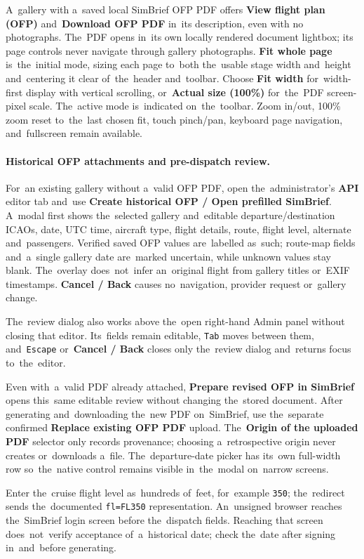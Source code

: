 \documentclass[11pt,a4paper]{article}
\newcommand{\ui}[1]{\textbf{#1}}
\newcommand{\codeword}[1]{\nolinkurl{#1}}
\begin{document}
A~gallery with a~saved local SimBrief OFP PDF offers \ui{View flight plan (OFP)}
and~\ui{Download OFP PDF} in~its description, even with no photographs. The~PDF
opens in~its own locally rendered document lightbox; its page controls never
navigate through gallery photographs. \ui{Fit whole page} is~the~initial mode,
sizing each page to~both the~usable stage width and~height and~centering it
clear of~the~header and~toolbar. Choose \ui{Fit width} for~width-first display
with vertical scrolling, or~\ui{Actual size (100\%)} for~the~PDF screen-pixel
scale. The~active mode is~indicated on~the~toolbar. Zoom in/out, 100\% zoom
reset to~the~last chosen fit, touch pinch/pan, keyboard page navigation,
and~fullscreen remain available.

\paragraph{Historical OFP attachments and pre-dispatch review.}
For~an existing gallery without a~valid OFP PDF, open the~administrator's
\ui{API} editor tab and~use \ui{Create historical OFP / Open prefilled
SimBrief}. A~modal first shows the~selected gallery and~editable
departure/destination ICAOs, date, UTC time, aircraft type, flight details,
route, flight level, alternate and~passengers. Verified saved OFP values
are~labelled as~such; route-map fields and~a~single gallery date are~marked
uncertain, while unknown values stay blank. The~overlay does~not~infer
an~original flight from gallery titles or~EXIF timestamps. \ui{Cancel / Back}
causes no~navigation, provider request or~gallery change.

The~review dialog also works above the~open right-hand Admin panel without
closing that editor. Its~fields remain editable, \codeword{Tab} moves between
them, and~\codeword{Escape} or~\ui{Cancel / Back} closes only the~review dialog
and~returns focus to~the~editor.

Even with~a~valid PDF already attached, \ui{Prepare revised OFP in SimBrief}
opens this~same editable review without changing the~stored document. After
generating and~downloading the~new PDF on~SimBrief, use the~separate confirmed
\ui{Replace existing OFP PDF} upload. The~\ui{Origin of the uploaded PDF}
selector only records provenance; choosing a~retrospective origin never creates
or~downloads a~file. The~departure-date picker has its~own full-width row
so~the~native control remains visible in~the~modal on~narrow screens.

Enter the~cruise flight level as~hundreds of~feet, for~example \codeword{350};
the~redirect sends the~documented \codeword{fl=FL350} representation.
An~unsigned browser reaches the~SimBrief login screen before the~dispatch
fields. Reaching that screen does~not~verify acceptance of~a~historical date;
check the~date after signing in~and~before generating.
\end{document}
